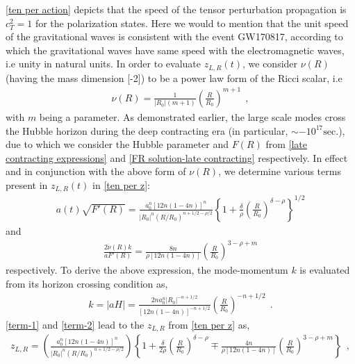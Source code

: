\documentclass{article}
\begin{document}
\ref{ten per action} depicts that the speed of the tensor perturbation propagation is $c_T^2 = 1$ for the polarization states. Here we would to mention 
that the unit speed of the gravitational waves is consistent with the event GW170817, according to which the gravitational waves have same speed 
with the electromagnetic waves, i.e unity in natural units. In order to evaluate 
$z_{L,R}(t)$, we consider $\nu(R)$ (having the mass dimension [-2]) to be a power law form of the Ricci scalar, i.e
\begin{eqnarray}
 \nu(R) = \frac{1}{\left|R_0\right|(m+1)}\left(\frac{R}{R_0}\right)^{m+1}~~,
 \label{nu-form}
\end{eqnarray}
with $m$ being a parameter. 
As demonstrated earlier, the large scale modes cross the Hubble horizon during the deep contracting era (in particular, $\sim -10^{17}\mathrm{sec.}$), 
due to which we consider the Hubble parameter and $F(R)$ from \ref{late contracting expressions} and \ref{FR solution-late contracting} respectively. 
In effect and in conjunction with the above form of $\nu(R)$, we determine various terms present in $z_{L,R}(t)$ in \ref{ten per z}:
\begin{eqnarray}
a(t)\sqrt{F'(R)} = \frac{a_0^n\left[12n(1-4n)\right]^n}{\left|R_0\right|^n\left(R/R_0\right)^{n+1/2-\rho/2}}
\left\{1 + \frac{\delta}{\rho}\left(\frac{R}{R_0}\right)^{\delta - \rho}\right\}^{1/2}
\label{term-1}
\end{eqnarray}
and
\begin{eqnarray}
 \frac{2\dot{\nu}(R)k}{aF'(R)} = \frac{8n}{\rho\left[12n(1-4n)\right]}\left(\frac{R}{R_0}\right)^{3-\rho+m}
 \label{term-2}
\end{eqnarray}
respectively. To derive the above expression, the mode-momentum $k$ is evaluated from its horizon crossing condition as,
\begin{eqnarray}
 k = \left|aH\right| = \frac{2na_0^n\left|R_0\right|^{-n+1/2}}{\left[12n(1-4n)\right]^{-n+1/2}}
 \left(\frac{R}{R_0}\right)^{-n+1/2}~~.
 \label{mode-momentum}
\end{eqnarray}
\ref{term-1} and \ref{term-2} lead to the $z_{L,R}$ from \ref{ten per z} as,
\begin{eqnarray}
 z_{L,R} = \left(\frac{a_0^n\left[12n(1-4n)\right]^n}{\left|R_0\right|^n\left(R/R_0\right)^{n+1/2-\rho/2}}\right)
 \left\{1 + \frac{\delta}{2\rho}\left(\frac{R}{R_0}\right)^{\delta - \rho} 
 \mp \frac{4n}{\rho\left[12n(1-4n)\right]}\left(\frac{R}{R_0}\right)^{3-\rho+m}\right\}~~,
 \label{z-final-1}
\end{eqnarray}
\end{document}
